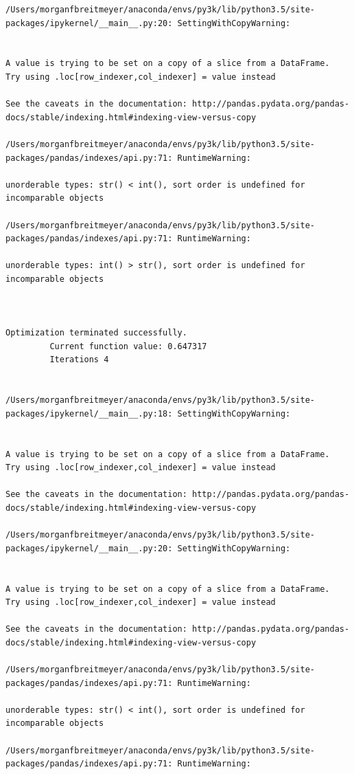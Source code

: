 \begin{lstlisting}
/Users/morganfbreitmeyer/anaconda/envs/py3k/lib/python3.5/site-packages/ipykernel/__main__.py:20: SettingWithCopyWarning:


A value is trying to be set on a copy of a slice from a DataFrame.
Try using .loc[row_indexer,col_indexer] = value instead

See the caveats in the documentation: http://pandas.pydata.org/pandas-docs/stable/indexing.html#indexing-view-versus-copy

/Users/morganfbreitmeyer/anaconda/envs/py3k/lib/python3.5/site-packages/pandas/indexes/api.py:71: RuntimeWarning:

unorderable types: str() < int(), sort order is undefined for incomparable objects

/Users/morganfbreitmeyer/anaconda/envs/py3k/lib/python3.5/site-packages/pandas/indexes/api.py:71: RuntimeWarning:

unorderable types: int() > str(), sort order is undefined for incomparable objects



Optimization terminated successfully.
         Current function value: 0.647317
         Iterations 4


/Users/morganfbreitmeyer/anaconda/envs/py3k/lib/python3.5/site-packages/ipykernel/__main__.py:18: SettingWithCopyWarning:


A value is trying to be set on a copy of a slice from a DataFrame.
Try using .loc[row_indexer,col_indexer] = value instead

See the caveats in the documentation: http://pandas.pydata.org/pandas-docs/stable/indexing.html#indexing-view-versus-copy

/Users/morganfbreitmeyer/anaconda/envs/py3k/lib/python3.5/site-packages/ipykernel/__main__.py:20: SettingWithCopyWarning:


A value is trying to be set on a copy of a slice from a DataFrame.
Try using .loc[row_indexer,col_indexer] = value instead

See the caveats in the documentation: http://pandas.pydata.org/pandas-docs/stable/indexing.html#indexing-view-versus-copy

/Users/morganfbreitmeyer/anaconda/envs/py3k/lib/python3.5/site-packages/pandas/indexes/api.py:71: RuntimeWarning:

unorderable types: str() < int(), sort order is undefined for incomparable objects

/Users/morganfbreitmeyer/anaconda/envs/py3k/lib/python3.5/site-packages/pandas/indexes/api.py:71: RuntimeWarning:


\end{lstlisting}
